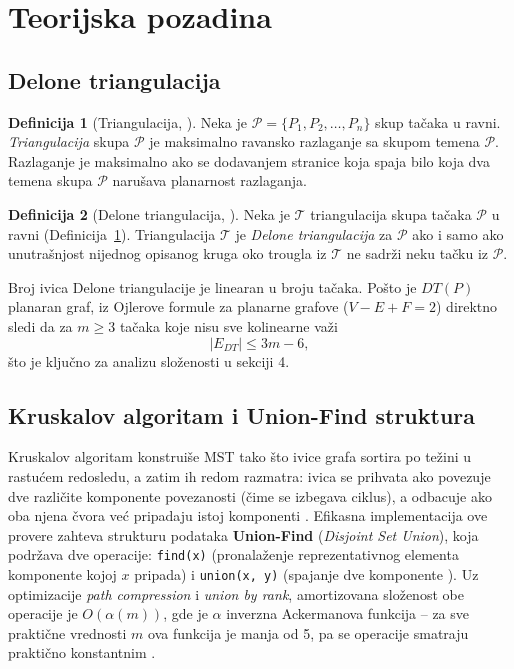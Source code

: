 \documentclass[11pt]{article}
\theoremstyle{definition}
\newtheorem{definition}{Definicija}[section]
\begin{document}
\section{Teorijska pozadina}

\subsection{Delone triangulacija}

\begin{definition}[Triangulacija, \cite{janicic}]
\label{def:triangulacija}
Neka je $\mathcal{P} = \{P_1, P_2, \ldots, P_n\}$ skup tačaka u ravni.
\emph{Triangulacija} skupa $\mathcal{P}$ je maksimalno ravansko razlaganje sa
skupom temena $\mathcal{P}$. Razlaganje je maksimalno ako se dodavanjem
stranice koja spaja bilo koja dva temena skupa $\mathcal{P}$ narušava
planarnost razlaganja.
\end{definition}

\begin{definition}[Delone triangulacija, \cite{janicic}]
\label{def:delone}
Neka je $\mathcal{T}$ triangulacija skupa tačaka $\mathcal{P}$ u ravni
(Definicija~\ref{def:triangulacija}). Triangulacija $\mathcal{T}$ je
\emph{Delone triangulacija} za $\mathcal{P}$ ako i samo ako unutrašnjost
nijednog opisanog kruga oko trougla iz $\mathcal{T}$ ne sadrži neku tačku
iz $\mathcal{P}$.
\end{definition}

Broj ivica Delone triangulacije je linearan u broju tačaka. Pošto je $DT(P)$ planaran graf, iz Ojlerove formule za planarne grafove ($V - E + F = 2$) direktno sledi da za $m \ge 3$ tačaka koje nisu sve kolinearne važi
\[
|E_{DT}| \le 3m - 6,
\]
što je ključno za analizu složenosti u sekciji 4.

\subsection{Kruskalov algoritam i Union-Find struktura}

Kruskalov algoritam konstruiše MST tako što ivice grafa sortira po težini u rastućem redosledu, a zatim ih redom razmatra: ivica se prihvata ako povezuje dve različite komponente povezanosti (čime se izbegava ciklus), a odbacuje ako oba njena čvora već pripadaju istoj komponenti \cite{cormen}. Efikasna implementacija ove provere zahteva strukturu podataka \textbf{Union-Find} (\emph{Disjoint Set Union}), koja podržava dve operacije: \texttt{find(x)} (pronalaženje reprezentativnog elementa komponente kojoj $x$ pripada) i \texttt{union(x, y)} (spajanje dve komponente )\cite{cormen}. Uz optimizacije \emph{path compression} i \emph{union by rank}, amortizovana složenost obe operacije je $O(\alpha(m))$, gde je $\alpha$ inverzna Ackermanova funkcija -- za sve praktične vrednosti $m$ ova funkcija je manja od 5, pa se operacije smatraju praktično konstantnim \cite[Teorema 21.14]{cormen}.
\end{document}
